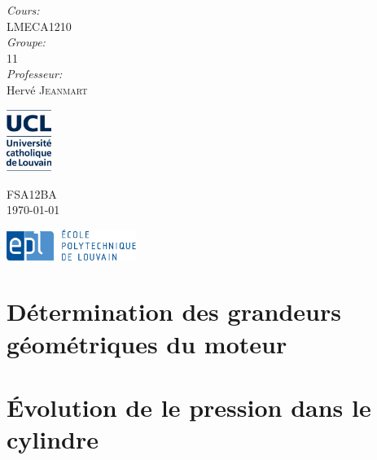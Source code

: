 \documentclass{article}
\begin{document}
\begin{titlepage}
\begin{center}
\begin{minipage}{0.4\textwidth}
\begin{flushleft}
\begin{tabular}{l l}
\end{tabular}
\end{flushleft}
\end{minipage}
\begin{minipage}{0.4\textwidth}
\begin{flushright} \large
\emph{Cours:} \\
LMECA1210\\
\emph{Groupe:} \\
11\\
\emph{Professeur:} \\
Hervé \textsc{Jeanmart}
\end{flushright}
\end{minipage}
\vspace{0.3cm}

\begin{minipage}{0.3\textwidth}
\begin{flushleft}
\includegraphics[height=2cm]{Schema/logo_UCL_NEW_janv2013.JPG}
\end{flushleft}
\end{minipage}
\begin{minipage}{0.3\textwidth}
\begin{center}
{\large FSA12BA}\\
{\large \today}
\end{center}
\end{minipage}
\begin{minipage}{0.3\textwidth}
\begin{flushright}
\includegraphics[height=1cm]{Schema/epl-logo.jpg}
\end{flushright}
\end{minipage}
\end{center}
\end{titlepage}
\tableofcontents
\section{Détermination des grandeurs géométriques du moteur}
\section{Évolution de le pression dans le cylindre}
\end{document}
